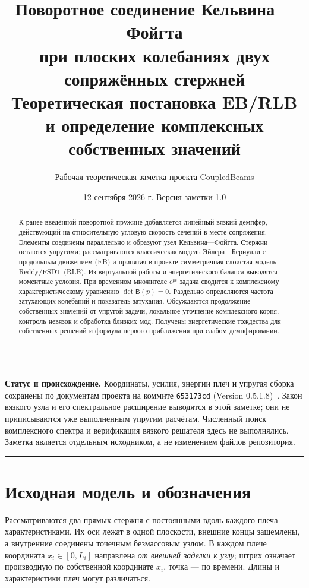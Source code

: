 \documentclass[11pt,a4paper]{article}
\title{\vspace{-1.1em}\textbf{Поворотное соединение Кельвина—Фойгта\\при плоских колебаниях двух сопряжённых стержней}\\[0.5em]
\large Теоретическая постановка EB/RLB\\и определение комплексных собственных значений}
\author{\normalsize Рабочая теоретическая заметка проекта CoupledBeams}
\date{\normalsize 12 сентября 2026 г. \quad Версия заметки 1.0}
\numberwithin{equation}{section}
\newcommand{\BB}{\mathsf B}
\newcommand{\noteblock}[1]{\par\medskip\noindent\begin{minipage}{\linewidth}\hrule\smallskip#1\smallskip\hrule\end{minipage}\par\medskip}
\begin{document}
\maketitle
\thispagestyle{empty}
\begin{abstract}
К ранее введённой поворотной пружине добавляется линейный вязкий демпфер,
действующий на относительную угловую скорость сечений в месте сопряжения.
Элементы соединены параллельно и образуют узел Кельвина—Фойгта. Стержни
остаются упругими; рассматриваются классическая модель Эйлера—Бернулли
с продольным движением (EB) и принятая в проекте симметричная слоистая
модель Reddy/FSDT (RLB). Из виртуальной работы и энергетического баланса
выводятся моментные условия. При временном множителе $e^{pt}$ задача
сводится к комплексному характеристическому уравнению
$\det\BB(p)=0$. Раздельно определяются частота затухающих колебаний
и показатель затухания. Обсуждаются продолжение собственных значений
от упругой задачи, локальное уточнение комплексного корня, контроль
невязок и обработка близких мод. Получены энергетические тождества
для собственных решений и формула первого приближения при слабом
демпфировании.
\end{abstract}

\noteblock{\textbf{Статус и происхождение.}
Координаты, усилия, энергии плеч и упругая сборка сохранены по документам
проекта на коммите \texttt{653173cd} (Version 0.5.1.8)~\cite{projectjoint,projectsource}.
Закон вязкого узла и его спектральное расширение выводятся в этой заметке;
они не приписываются уже выполненным упругим расчётам. Численный поиск
комплексного спектра и верификация вязкого решателя здесь не выполнялись.
Заметка является отдельным исходником, а не изменением файлов репозитория.}

\begingroup
\small
\setlength{\parskip}{0pt}
\tableofcontents
\endgroup
\newpage

\section{Исходная модель и обозначения}
\label{sec:model}

Рассматриваются два прямых стержня с постоянными вдоль каждого плеча
характеристиками. Их оси лежат в одной плоскости, внешние концы защемлены,
а внутренние соединены точечным безмассовым узлом. В каждом плече координата
$x_i\in[0,L_i]$ направлена \emph{от внешней заделки к узлу}; штрих означает
производную по собственной координате $x_i$, точка --- по времени.
Длины и характеристики плеч могут различаться.
\end{document}

